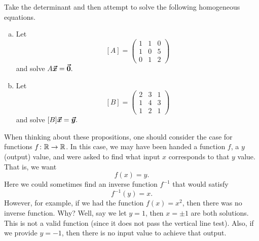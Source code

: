     \begin{exercise}
        Take the determinant and then attempt to solve the following homogeneous equations.
        \begin{enumerate}[(a)]
            \item Let 
            \[
            [A]=\begin{pmatrix}
            1 & 1 & 0\\
            1 & 0 & 5\\
            0 & 1 & 2
            \end{pmatrix}
            \]
            and solve $A\boldsymbol{\boldsymbol{\vec{x}}}=\boldsymbol{\vec{0}}.$
            \item Let
            \[
            [B]=\begin{pmatrix}
            2 & 3 & 1\\
            1 & 4 & 3\\
            1 & 2 & 1
            \end{pmatrix}
            \]
            and solve $[B]\boldsymbol{\boldsymbol{\vec{x}}}=\boldsymbol{\boldsymbol{\vec{y}}}.$
        \end{enumerate}
        \end{exercise}
        
        When thinking about these propositions, one should consider the case for functions $f\colon \mathbb{R}\to \mathbb{R}$.  In this case, we may have been handed a function $f$, a $y$ (output) value, and were asked to find what input $x$ corresponds to that $y$ value. That is, we want
        \[
        f(x)=y.
        \]
        Here we could sometimes find an inverse function $f^{-1}$ that would satisfy
        \[
        f^{-1}(y)=x.
        \]
        However, for example, if we had the function $f(x)=x^2$, then there was no inverse function.  Why? Well, say we let $y=1$, then $x=\pm 1$ are both solutions. This is not a valid function (since it does not pass the vertical line test). Also, if we provide $y=-1$, then there is no input value to achieve that output.
        
